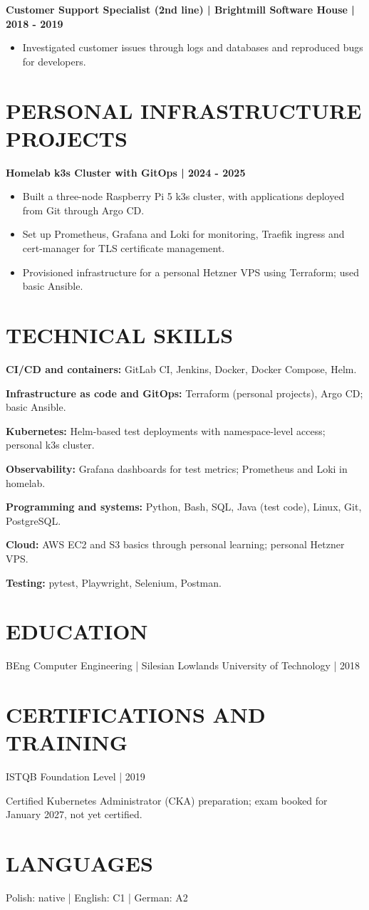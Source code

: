 \documentclass[11pt,a4paper]{article}
\newcommand{\cvsection}[1]{\section*{#1}}
\newcommand{\cvrole}[1]{\noindent\textbf{#1}\par}
\begin{document}
\cvrole{Customer Support Specialist (2nd line) | Brightmill Software House | 2018 - 2019}
\begin{itemize}
\item Investigated customer issues through logs and databases and reproduced bugs for developers.
\end{itemize}

\newpage
\cvsection{PERSONAL INFRASTRUCTURE PROJECTS}
\cvrole{Homelab k3s Cluster with GitOps | 2024 - 2025}
\begin{itemize}
\item Built a three-node Raspberry Pi 5 k3s cluster, with applications deployed from Git through Argo CD.
\item Set up Prometheus, Grafana and Loki for monitoring, Traefik ingress and cert-manager for TLS certificate management.
\item Provisioned infrastructure for a personal Hetzner VPS using Terraform; used basic Ansible.
\end{itemize}

\cvsection{TECHNICAL SKILLS}
\textbf{CI/CD and containers:} GitLab CI, Jenkins, Docker, Docker Compose, Helm.\par
\textbf{Infrastructure as code and GitOps:} Terraform (personal projects), Argo CD; basic Ansible.\par
\textbf{Kubernetes:} Helm-based test deployments with namespace-level access; personal k3s cluster.\par
\textbf{Observability:} Grafana dashboards for test metrics; Prometheus and Loki in homelab.\par
\textbf{Programming and systems:} Python, Bash, SQL, Java (test code), Linux, Git, PostgreSQL.\par
\textbf{Cloud:} AWS EC2 and S3 basics through personal learning; personal Hetzner VPS.\par
\textbf{Testing:} pytest, Playwright, Selenium, Postman.

\cvsection{EDUCATION}
BEng Computer Engineering | Silesian Lowlands University of Technology | 2018

\cvsection{CERTIFICATIONS AND TRAINING}
ISTQB Foundation Level | 2019\par
Certified Kubernetes Administrator (CKA) preparation; exam booked for January 2027, not yet certified.

\cvsection{LANGUAGES}
Polish: native | English: C1 | German: A2
\end{document}
